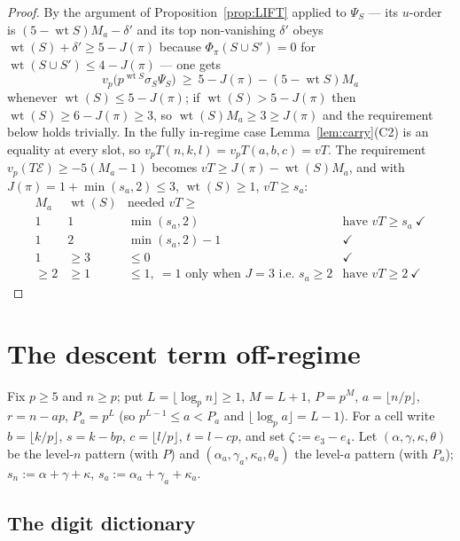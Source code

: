 \documentclass[11pt,reqno]{amsart}
\theoremstyle{plain}
\theoremstyle{definition}
\theoremstyle{remark}
\numberwithin{equation}{section}
\newcommand{\wt}{\operatorname{wt}}
\newcommand{\Ecal}{\mathcal{E}}
\begin{document}
\begin{proof}
By the argument of Proposition~\ref{prop:LIFT} applied to $\Psi_S$ --- its $u$-order is
$(5-\wt S)M_a-\delta'$ and its top non-vanishing $\delta'$ obeys $\wt(S)+\delta'\ge5-J(\pi)$
because $\Phi_\pi(S\cup S')=0$ for $\wt(S\cup S')\le4-J(\pi)$ --- one gets
\[
v_p\bigl(p^{\wt S}\sigma_S\Psi_S\bigr)\ \ge\ 5-J(\pi)-(5-\wt S)M_a
\]
whenever $\wt(S)\le5-J(\pi)$; if $\wt(S)>5-J(\pi)$ then $\wt(S)\ge6-J(\pi)\ge3$, so
$\wt(S)M_a\ge3\ge J(\pi)$ and the requirement below holds trivially. In the fully in-regime
case Lemma~\ref{lem:carry}(C2) is an equality at every slot, so $v_pT(n,k,l)=v_pT(a,b,c)=vT$. The requirement
$v_p(T\Ecal)\ge-5(M_a-1)$ becomes $vT\ge J(\pi)-\wt(S)M_a$, and with $J(\pi)=1+\min(s_a,2)\le3$,
$\wt(S)\ge1$, $vT\ge s_a$:
\[
\begin{array}{cccl}
M_a & \wt(S) & \text{needed }vT\ge & \\\hline
1 & 1 & \min(s_a,2) & \text{have }vT\ge s_a\ \checkmark\\
1 & 2 & \min(s_a,2)-1 & \checkmark\\
1 & \ge3 & \le0 & \checkmark\\
\ge2 & \ge1 & \le1,\ =1\text{ only when }J=3\text{ i.e. }s_a\ge2 & \text{have }vT\ge2\ \checkmark
\end{array}
\]
\end{proof}

\section{The descent term off-regime}\label{sec:gapdesc}

Fix $p\ge5$ and $n\ge p$; put $L=\lfloor\log_pn\rfloor\ge1$, $M=L+1$, $P=p^M$,
$a=\lfloor n/p\rfloor$, $r=n-ap$, $P_a=p^L$ (so $p^{L-1}\le a<P_a$ and
$\lfloor\log_pa\rfloor=L-1$). For a cell write $b=\lfloor k/p\rfloor$, $s=k-bp$,
$c=\lfloor l/p\rfloor$, $t=l-cp$, and set $\zeta:=e_3-e_4$. Let $(\alpha,\gamma,\kappa,\theta)$
be the level-$n$ pattern (with $P$) and $(\alpha_a,\gamma_a,\kappa_a,\theta_a)$ the level-$a$
pattern (with $P_a$); $s_n:=\alpha+\gamma+\kappa$, $s_a:=\alpha_a+\gamma_a+\kappa_a$.

\subsection{The digit dictionary}
\end{document}
